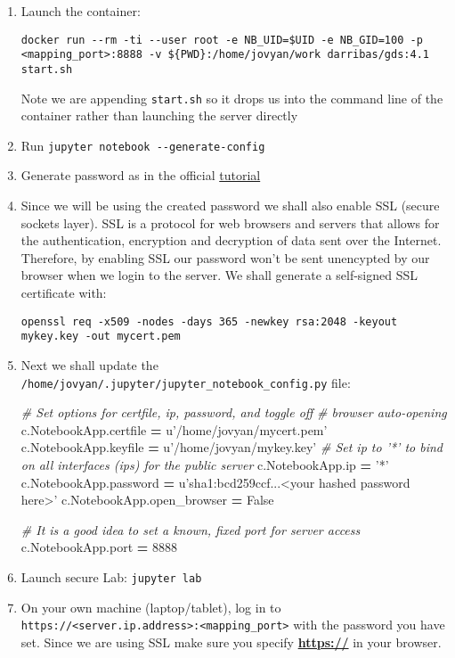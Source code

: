 \documentclass[
]{book}
\newenvironment{Shaded}{\begin{snugshade}}{\end{snugshade}}
\newcommand{\CommentTok}[1]{\textcolor[rgb]{0.56,0.35,0.01}{\textit{#1}}}
\newcommand{\DecValTok}[1]{\textcolor[rgb]{0.00,0.00,0.81}{#1}}
\newcommand{\NormalTok}[1]{#1}
\newcommand{\OperatorTok}[1]{\textcolor[rgb]{0.81,0.36,0.00}{\textbf{#1}}}
\newcommand{\StringTok}[1]{\textcolor[rgb]{0.31,0.60,0.02}{#1}}
\newcommand{\VariableTok}[1]{\textcolor[rgb]{0.00,0.00,0.00}{#1}}
\begin{document}
\begin{enumerate}
\def\labelenumi{\arabic{enumi}.}
\item
  Launch the container:

\begin{verbatim}
docker run --rm -ti --user root -e NB_UID=$UID -e NB_GID=100 -p <mapping_port>:8888 -v ${PWD}:/home/jovyan/work darribas/gds:4.1 start.sh  
\end{verbatim}

  Note we are appending \texttt{start.sh} so it drops us into
  the command line of the container rather than launching the server directly
\item
  Run \texttt{jupyter\ notebook\ -\/-generate-config}
\item
  Generate password as in the official \href{http://jupyter-notebook.readthedocs.io/en/stable/public_server.html\#preparing-a-hashed-password}{tutorial}
\item
  Since we will be using the created password we shall also enable SSL (secure sockets layer). SSL is a protocol for web browsers and servers that allows for the authentication, encryption and decryption of data sent over the Internet. Therefore, by enabling SSL our password won't be sent unencypted by our browser when we login to the server. We shall generate a self-signed SSL certificate with:

\begin{verbatim}
openssl req -x509 -nodes -days 365 -newkey rsa:2048 -keyout mykey.key -out mycert.pem
\end{verbatim}
\item
  Next we shall update the \texttt{/home/jovyan/.jupyter/jupyter\_notebook\_config.py} file:

\begin{Shaded}
\begin{Highlighting}[]
\CommentTok{# Set options for certfile, ip, password, and toggle off}
\CommentTok{# browser auto-opening}
\NormalTok{c.NotebookApp.certfile }\OperatorTok{=} \StringTok{u'/home/jovyan/mycert.pem'}
\NormalTok{c.NotebookApp.keyfile }\OperatorTok{=} \StringTok{u'/home/jovyan/mykey.key'}
\CommentTok{# Set ip to '*' to bind on all interfaces (ips) for the public server}
\NormalTok{c.NotebookApp.ip }\OperatorTok{=} \StringTok{'*'}
\NormalTok{c.NotebookApp.password }\OperatorTok{=} \StringTok{u'sha1:bcd259ccf...<your hashed password here>'}
\NormalTok{c.NotebookApp.open_browser }\OperatorTok{=} \VariableTok{False}

\CommentTok{# It is a good idea to set a known, fixed port for server access}
\NormalTok{c.NotebookApp.port }\OperatorTok{=} \DecValTok{8888}
\end{Highlighting}
\end{Shaded}
\item
  Launch secure Lab: \texttt{jupyter\ lab}
\item
  On your own machine (laptop/tablet), log in to \texttt{https://\textless{}server.ip.address\textgreater{}:\textless{}mapping\_port\textgreater{}} with the password you have set. Since we are using SSL make sure you specify \textbf{\url{https://}} in your browser.
\end{enumerate}
\end{document}
